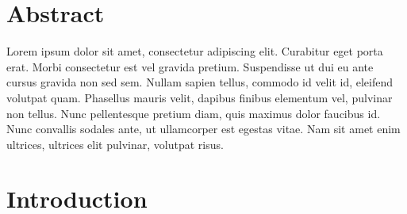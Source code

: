 \documentclass[10pt,letterpaper]{article}
\newcommand{\getIndex}[2]{
  \ForEach{,}{\IfEq{#1}{\thislevelitem}{\number\thislevelcount\ExitForEach}{}}{#2}
}
\newcommand{\getAff}[1]{
  \getIndex{#1}{Smith College,Smith College,Smith College}
}
\begin{document}
\vspace*{0.2in}

\section*{Abstract}
Lorem ipsum dolor sit amet, consectetur adipiscing elit. Curabitur eget
porta erat. Morbi consectetur est vel gravida pretium. Suspendisse ut
dui eu ante cursus gravida non sed sem. Nullam sapien tellus, commodo id
velit id, eleifend volutpat quam. Phasellus mauris velit, dapibus
finibus elementum vel, pulvinar non tellus. Nunc pellentesque pretium
diam, quis maximus dolor faucibus id. Nunc convallis sodales ante, ut
ullamcorper est egestas vitae. Nam sit amet enim ultrices, ultrices elit
pulvinar, volutpat risus.


\linenumbers

\section{Introduction}\label{introduction}
\end{document}
